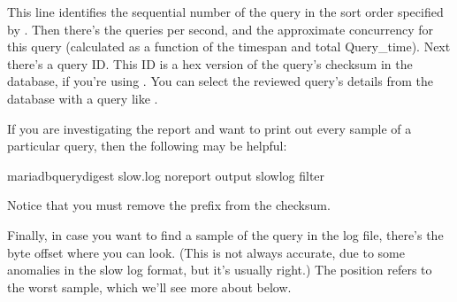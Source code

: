 \documentclass[letterpaper,10pt,english]{sphinxmanual}
\begin{document}
\begin{sphinxVerbatim}[commandchars=\\\{\}]
\end{sphinxVerbatim}

\sphinxAtStartPar
This line identifies the sequential number of the query in the sort order
specified by {\hyperref[\detokenize{mariadb-query-digest:cmdoption-mariadb-query-digest-order-by}]{}}.  Then there’s the queries per second, and the
approximate concurrency for this query (calculated as a function of the timespan
and total Query\_time).  Next there’s a query ID.  This ID is a hex version of
the query’s checksum in the database, if you’re using {\hyperref[\detokenize{mariadb-query-digest:cmdoption-mariadb-query-digest-review}]{}}.  You can
select the reviewed query’s details from the database with a query like .

\sphinxAtStartPar
If you are investigating the report and want to print out every sample of a
particular query, then the following {\hyperref[\detokenize{mariadb-query-digest:cmdoption-mariadb-query-digest-filter}]{}} may be helpful:

\begin{sphinxVerbatim}[commandchars=\\\{\}]
mariadb\PYGZhy{}query\PYGZhy{}digest slow.log           
   \PYGZhy{}\PYGZhy{}no\PYGZhy{}report                     
   \PYGZhy{}\PYGZhy{}output slowlog                
   \PYGZhy{}\PYGZhy{}filter 
\end{sphinxVerbatim}

\sphinxAtStartPar
Notice that you must remove the  prefix from the checksum.

\sphinxAtStartPar
Finally, in case you want to find a sample of the query in the log file, there’s
the byte offset where you can look.  (This is not always accurate, due to some
anomalies in the slow log format, but it’s usually right.)  The position
refers to the worst sample, which we’ll see more about below.
\end{document}
